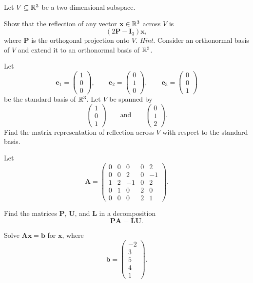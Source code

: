 \begin{problem}
Let $V\subseteq\mathbb{R}^3$ be a two-dimensional subspace.
\begin{problemsubparts}
\item Show that the reflection of any vector $\mathbf x\in\mathbb{R}^3$ across $V$ is
\[
(2\mathbf P-\mathbf I_3)\mathbf x,
\]
where $\mathbf P$ is the orthogonal projection onto $V$. \textit{Hint.} Consider an orthonormal basis of $V$ and extend it to an orthonormal basis of $\mathbb{R}^3$.
\item Let
\[
\mathbf e_1=
\begin{pmatrix}
1\\0\\0
\end{pmatrix},
\qquad
\mathbf e_2=
\begin{pmatrix}
0\\1\\0
\end{pmatrix},
\qquad
\mathbf e_3=
\begin{pmatrix}
0\\0\\1
\end{pmatrix}
\]
be the standard basis of $\mathbb{R}^3$. Let $V$ be spanned by
\[
\begin{pmatrix}
1\\0\\1
\end{pmatrix}
\qquad\text{and}\qquad
\begin{pmatrix}
0\\1\\2
\end{pmatrix}.
\]
Find the matrix representation of reflection across $V$ with respect to the standard basis.
\end{problemsubparts}
\end{problem}

\begin{problem}
Let
\[
\mathbf A=
\begin{pmatrix}
0&0&0&0&2\\
0&0&2&0&-1\\
1&2&-1&0&2\\
0&1&0&2&0\\
0&0&0&2&1
\end{pmatrix}.
\]
\begin{problemsubparts}
\item Find the matrices $\mathbf P$, $\mathbf U$, and $\mathbf L$ in a decomposition
\[
\mathbf P\mathbf A=\mathbf L\mathbf U.
\]
\item Solve $\mathbf A\mathbf x=\mathbf b$ for $\mathbf x$, where
\[
\mathbf b=
\begin{pmatrix}
-2\\3\\5\\4\\1
\end{pmatrix}.
\]
\end{problemsubparts}
\end{problem}

